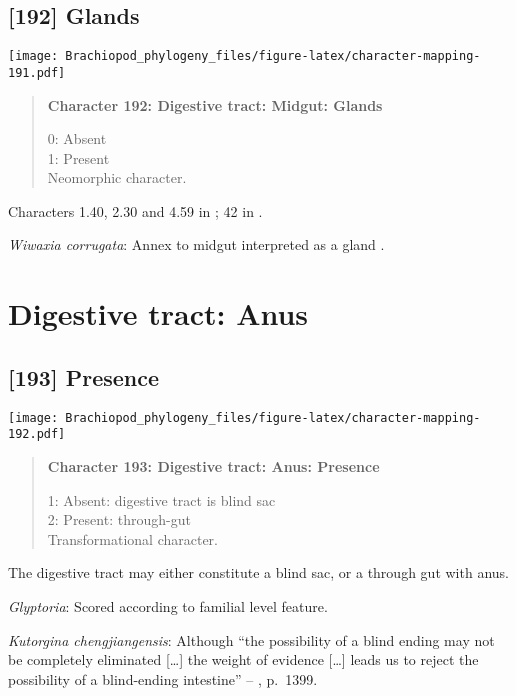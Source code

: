 \documentclass[openany]{book}
\theoremstyle{definition}
\theoremstyle{definition}
\theoremstyle{definition}
\theoremstyle{remark}
\begin{document}
\subsection*{{[}192{]} Glands}\label{glands-1}

\texttt{[image: Brachiopod\_phylogeny\_files/figure-latex/character-mapping-191.pdf]}

\begin{quote}
\textbf{Character 192: Digestive tract: Midgut: Glands}

0: Absent\\
1: Present\\
Neomorphic character.
\end{quote}

Characters 1.40, 2.30 and 4.59 in \citet{SPS1996}; 42 in
\citet{Haszprunar2000}.

\hypertarget{Wiwaxia_corrugata-coding-192}{}
\emph{Wiwaxia corrugata}: Annex to midgut interpreted as a gland
\citep{Smith2012M}.

\section{Digestive tract: Anus}\label{digestive-tract-anus}

\subsection*{{[}193{]} Presence}\label{presence-5}

\texttt{[image: Brachiopod\_phylogeny\_files/figure-latex/character-mapping-192.pdf]}

\begin{quote}
\textbf{Character 193: Digestive tract: Anus: Presence}

1: Absent: digestive tract is blind sac\\
2: Present: through-gut\\
Transformational character.
\end{quote}

The digestive tract may either constitute a blind sac, or a through gut
with anus.

\hypertarget{Glyptoria-coding-193}{}
\emph{Glyptoria}: Scored according to familial level feature.

\hypertarget{Kutorgina_chengjiangensis-coding-193}{}
\emph{Kutorgina chengjiangensis}: Although ``the possibility of a blind
ending may not be completely eliminated {[}\ldots{}{]} the weight of
evidence {[}\ldots{}{]} leads us to reject the possibility of a
blind-ending intestine'' --
\citet{Zhang2007Rhynchonelliformeanbrachiopods}, p.~1399.
\end{document}
